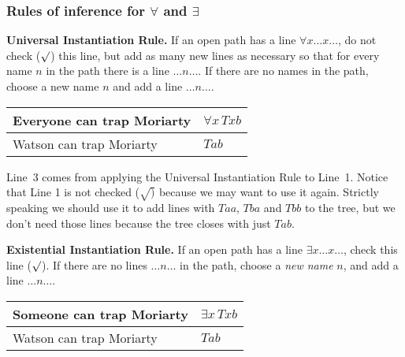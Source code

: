 \documentclass[letterpaper, 11pt]{article}
\theoremstyle{definition}
\begin{document}
\subsubsection{Rules of inference for $\forall$ and $\exists$}

{\bf Universal Instantiation Rule.} If an open path has a line $\forall x \ldots x \ldots$, do not check ($\surd$) this line, but add as many new lines as necessary so that for every name $n$ in the path there is a line $\ldots n \ldots$. If there are no names in the path, choose a new name $n$ and add a line $\ldots n \ldots$. 

\begin{center}
\begin{tabular}{ll}
Everyone can trap Moriarty & $\forall x\, Txb$\\\hline
Watson can trap Moriarty  &  $Tab$ 
\end{tabular}\quad
{}
\end{center}
Line~3 comes from applying the Universal Instantiation Rule to Line~1. Notice that Line 1 is not checked ($\surd)$ because we may want to use it again. Strictly speaking we should use it to add lines with $Taa$, $Tba$ and $Tbb$ to the tree, but we don't need those lines because the tree closes with just $Tab$.

{\bf Existential Instantiation Rule.} If an open path has a line $\exists x \ldots x \ldots$, check this line ($\surd$). If there are no lines $\ldots n \ldots$ in the path, choose a {\em new name} $n$, and add a line $\ldots n \ldots$.

\begin{tabular}{ll}
Someone can trap Moriarty & $\exists x\, Txb$\\\hline
Watson can trap Moriarty  &  $Tab$ 
\end{tabular}\quad
{}
\end{document}
